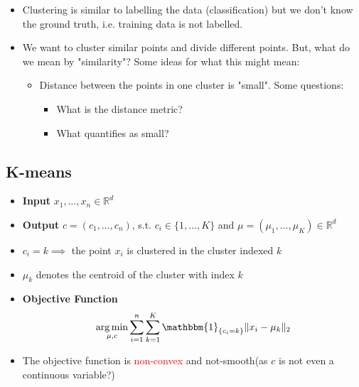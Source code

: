 \documentclass{article}
\DeclareMathOperator*{\argmin}{arg\,min}
\newcommand{\red}[1]{\textcolor{red}{#1}}
\begin{document}
\begin{itemize}
    \item Clustering is similar to labelling the data (classification) but we don't know the ground truth, i.e. training data is not labelled.
    \item We want to cluster similar points and divide different points. But, what do we mean by "similarity"? Some ideas for what this might mean:
        \begin{itemize}
            \item Distance between the points in one cluster is "small". Some questions:
                \begin{itemize}
                    \item What is the distance metric?
                    \item What quantifies as small?
                \end{itemize}
        \end{itemize}
\end{itemize}


\subsection{K-means}

\begin{itemize}
    \item \textbf{Input} $x_1, \dots, x_n \in \mathbb{R}^d$
    \item \textbf{Output} $c=(c_1, \dots, c_n)$, s.t. $c_i \in \{1, \dots, K\}$ and $\mu=(\mu_1, \dots, \mu_K) \in \mathbb{R}^d$
    \item $c_i=k \implies$ the point $x_i$ is clustered in the cluster indexed $k$
    \item $\mu_k$ denotes the centroid of the cluster with index $k$
    \item \textbf{Objective Function} $$\argmin_{\mu, c} \sum_{i=1}^n \sum_{k=1}^K \mathbbm{1}_{\{c_i=k\}} \Vert x_i-\mu_k \Vert_2$$
    \item The objective function is \red{non-convex} and not-smooth(as $c$ is not even a continuous variable?)
\end{itemize}
\end{document}
